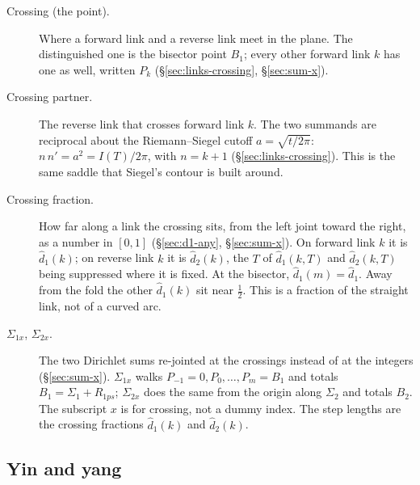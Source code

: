 \documentclass[11pt]{article}
\theoremstyle{definition}
\begin{document}
\begin{description}
\item[Crossing (the point).]
Where a forward link and a reverse link meet in the plane.
The distinguished one is the bisector point $B_1$; every other
forward link $k$ has one as well, written $P_k$
(\S\ref{sec:links-crossing}, \S\ref{sec:sum-x}).

\item[Crossing partner.]
The reverse link that crosses forward link $k$.
The two summands are reciprocal about the Riemann--Siegel cutoff
$a=\sqrt{t/2\pi}$:
$n\,n'=a^{2}=I(T)/2\pi$, with $n=k+1$
(\S\ref{sec:links-crossing}).
This is the same saddle that Siegel's contour is built around.

\item[Crossing fraction.]
How far along a link the crossing sits, from the left joint toward
the right, as a number in $[0,1]$
(\S\ref{sec:d1-any}, \S\ref{sec:sum-x}).
On forward link $k$ it is $\hat d_1(k)$; on reverse
link $k$ it is $\hat d_2(k)$, the $T$ of $\hat d_1(k,T)$ and
$\hat d_2(k,T)$ being suppressed where it is fixed.
At the bisector, $\hat d_1(m)=\hat d_1$.
Away from the fold the other $\hat d_1(k)$ sit near $\tfrac12$.
This is a fraction of the straight link, not of a curved arc.

\item[$\Sigma_{1x}$, $\Sigma_{2x}$.]
The two Dirichlet sums re-jointed at the crossings instead of at
the integers
(\S\ref{sec:sum-x}).
$\Sigma_{1x}$ walks $P_{-1}=0,P_0,\dots,P_m=B_1$ and totals
$B_1=\Sigma_1+R_{1ps}$;
$\Sigma_{2x}$ does the same from the origin along $\Sigma_2$ and
totals $B_2$.
The subscript $x$ is for crossing, not a dummy index.
The step lengths are the crossing fractions $\hat d_1(k)$ and
$\hat d_2(k)$.
\end{description}

\subsection*{Yin and yang}
\end{document}
